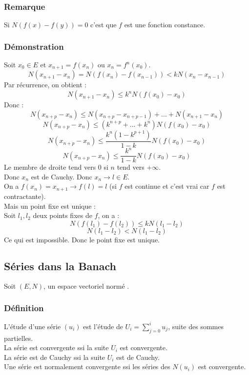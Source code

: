 \documentclass[a4paper, oneside]{report}
\newcommand{\evn}{espace vectoriel normé }
\begin{document}
\subsubsection{Remarque}

Si $N(f(x)-f(y))=0$ c'est que $f$ est une fonction constance.

\subsubsection{Démonstration}

Soit $x_0\in E$ et $x_{n+1}=f(x_n)$ ou $x_n=f^n(x_0)$.\\
$$N(x_{n+1}-x_n)=N(f(x_n)-f(x_{n-1}))< kN(x_n-x_{n-1})$$
Par récurrence, on obtient :
$$N(x_{n+1}-x_n) \leq k^nN(f(x_0)-x_0)$$
Donc :
$$N(x_{n+p}-x_n)\leq N(x_{n+p}-x_{n+p-1})+...+N(x_{n+1}-x_n)$$
$$N(x_{n+p}-x_n)\leq (k^{n+p}+...+k^n)N(f(x_0)-x_0)$$
$$N(x_{n+p}-x_n)\leq \frac{k^n(1-k^{p+1})}{1-k} N(f(x_0)-x_0)$$
$$N(x_{n+p}-x_n)\leq \frac{k^n}{1-k}N(f(x_0)-x_0)$$
Le membre de droite tend vers 0 si $n$ tend vers $+\infty$.\\
Donc $x_n$ est de Cauchy. Donc $x_n\rightarrow l \in E$.\\
On a $f(x_n)=x_{n+1}\rightarrow f(l)=l$ (si $f$ est continue et c'est vrai car $f$ est contractante).\\
Mais un point fixe est unique :\\
Soit $l_1,l_2$ deux points fixes de $f$, on a :
$$N(f(l_1)-f(l_2)) \leq kN(l_1-l_2)$$
$$N(l_1-l_2) < N(l_1-l_2)$$
Ce qui est impossible. Donc le point fixe est unique.

\subsection{Séries dans la Banach}

Soit $(E,N)$, un \evn.\\

\subsubsection{Définition}
L'étude d'une série $(u_i)$ est l'étude de $U_i=\sum_{j=0}^{i}u_j$, suite des sommes partielles.\\
La série est convergente ssi la suite $U_i$ est convergente.\\
La série est de Cauchy ssi la suite $U_i$ est de Cauchy.\\
Une série est normalement convergente ssi les séries des $N(u_i)$ est convergente.
\end{document}
